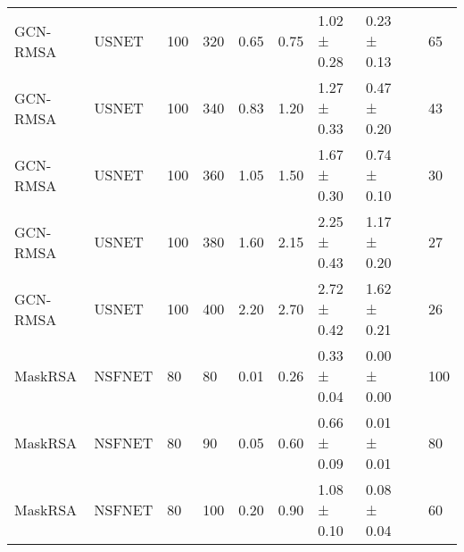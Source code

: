 \begin{longtable}[!htbp]{llll|lllll|l}
GCN-RMSA             & USNET             & 100                  & 320                                                               & 0.65 & \multicolumn{1}{l|}{0.75}    & 1.02 ± 0.28 & 0.23 ± 0.13      &                   & 65                                                                                    \\
GCN-RMSA             & USNET             & 100                  & 340                                                               & 0.83 & \multicolumn{1}{l|}{1.20}     & 1.27 ± 0.33 & 0.47 ± 0.20      &                   & 43                                                                                    \\
GCN-RMSA             & USNET             & 100                  & 360                                                               & 1.05 & \multicolumn{1}{l|}{1.50}     & 1.67 ± 0.30 & 0.74 ± 0.10      &                   & 30                                                                                    \\
GCN-RMSA             & USNET             & 100                  & 380                                                               & 1.60  & \multicolumn{1}{l|}{2.15}    & 2.25 ± 0.43 & 1.17 ± 0.20      &                   & 27                                                                                    \\
GCN-RMSA             & USNET             & 100                  & 400                                                               & 2.20  & \multicolumn{1}{l|}{2.70}     & 2.72 ± 0.42 & 1.62 ± 0.21      &                   & 26                                                                                    \\
MaskRSA              & NSFNET            & 80                   & 80                                                                & 0.01 & \multicolumn{1}{l|}{0.26}    & 0.33 ± 0.04 & 0.00 ± 0.00            &                   & 100                                                                                     \\
MaskRSA              & NSFNET            & 80                   & 90                                                                & 0.05 & \multicolumn{1}{l|}{0.60}     & 0.66 ± 0.09 & 0.01 ± 0.01           &                   & 80                                                                                     \\
MaskRSA              & NSFNET            & 80                   & 100                                                               & 0.20  & \multicolumn{1}{l|}{0.90}     & 1.08 ± 0.10  & 0.08 ± 0.04            &                   & 60                                                                                     \\

\end{longtable}
